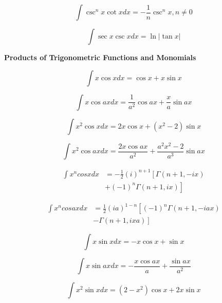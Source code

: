 \documentclass[11pt,twoside]{article}
\begin{document}
\begin{multicols}{3}
\begin{footnotesize}
\begin{equation}
\int \csc^nx \cot x dx = -\frac{1}{n}\csc^n x, n\ne 0
\end{equation}

\begin{equation}
\int \sec x \csc x dx = \ln | \tan x | 
\end{equation}


\begin{center} \textbf{Products of Trigonometric Functions and Monomials} \end{center}

\begin{equation}
\int x \cos x dx = \cos x + x \sin x 
\end{equation}

\begin{equation}
\int x \cos ax dx = \frac{1}{a^2} \cos ax + \frac{x}{a} \sin ax 
\end{equation}

\begin{equation}
\int x^2 \cos x dx = 2 x \cos x + \left ( x^2 - 2 \right ) \sin x 
\end{equation}

\begin{equation}
\int x^2 \cos ax dx = \frac{2 x \cos ax }{a^2} + \frac{ a^2 x^2 - 2  }{a^3} \sin ax 
\end{equation}

\begin{align}
\int  x^n cos x dx &= 
-\frac{1}{2}(i)^{n+1}\left [ \Gamma(n+1, -ix) 
\right . \nonumber \\ & \left .
+ (-1)^n \Gamma(n+1, ix)\right] 
\end{align}

\begin{align}
\int x^n cos ax dx &=
 \frac{1}{2}(ia)^{1-n}\left [ (-1)^n  \Gamma(n+1, -iax) 
 \right. \nonumber \\ & \left.
 -\Gamma(n+1, ixa)\right] 
\end{align}

\begin{equation}
\int x \sin x dx = -x \cos x + \sin x 
\end{equation}

\begin{equation}
\int x \sin ax dx = -\frac{x \cos ax}{a} + \frac{\sin ax}{a^2} 
\end{equation}

\begin{equation}
\int x^2 \sin x dx = \left(2-x^2\right) \cos x + 2 x \sin x
\end{equation}


\end{footnotesize}
\end{multicols}
\end{document}
